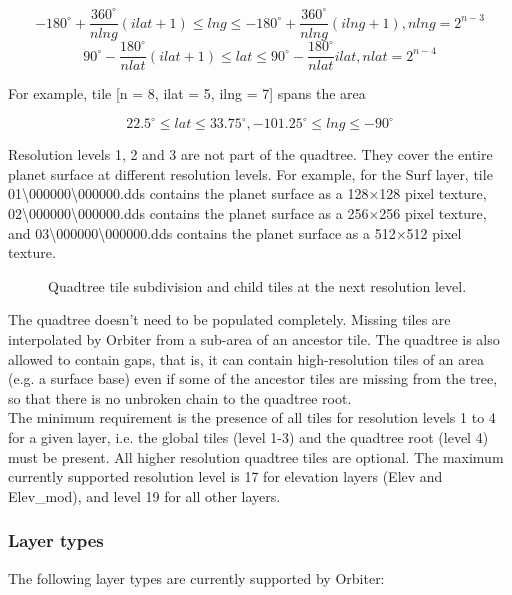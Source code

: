 \documentclass[Orbiter Developer Manual.tex]{subfiles}
\begin{document}
\[ -180^{\circ} + \frac{360^{\circ}}{nlng}(ilat + 1) \leq lng \leq -180^{\circ} + \frac{360^{\circ}}{nlng}(ilng + 1), nlng = 2^{n - 3} \]
\[ 90^{\circ} - \frac{180^{\circ}}{nlat}(ilat + 1) \leq lat \leq 90^{\circ} - \frac{180^{\circ}}{nlat}ilat, nlat = 2^{n - 4} \]

\noindent
For example, tile [n = 8, ilat = 5, ilng = 7] spans the area

\[ 22.5^{\circ} \leq lat \leq 33.75^{\circ}, -101.25^{\circ} \leq lng \leq -90^{\circ} \]

\noindent
Resolution levels 1, 2 and 3 are not part of the quadtree. They cover the entire planet surface at different resolution levels. For example, for the Surf layer, tile 01\textbackslash 000000\textbackslash 000000.dds contains the planet surface as a 128×128 pixel texture, 02\textbackslash 000000\textbackslash 000000.dds contains the planet surface as a 256×256 pixel texture, and  03\textbackslash 000000\textbackslash 000000.dds contains the planet surface as a 512×512 pixel texture.

\begin{figure}[H]
	\centering
	\caption{Quadtree tile subdivision and child tiles at the next resolution level.}
\end{figure}

\noindent
The quadtree doesn't need to be populated completely. Missing tiles are interpolated by Orbiter from a sub-area of an ancestor tile. The quadtree is also allowed to contain gaps, that is, it can contain high-resolution tiles of an area (e.g. a surface base) even if some of the ancestor tiles are missing from the tree, so that there is no unbroken chain to the quadtree root.\\
The minimum requirement is the presence of all tiles for resolution levels 1 to 4 for a given layer, i.e. the global tiles (level 1-3) and the quadtree root (level 4) must be present. All higher resolution quadtree tiles are optional. The maximum currently supported resolution level is 17 for elevation layers (Elev and Elev\_mod), and level 19 for all other layers.



\subsubsection{Layer types}
The following layer types are currently supported by Orbiter:\\
\end{document}
